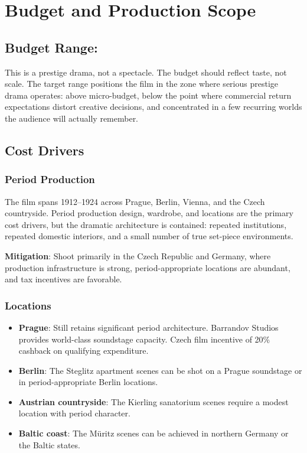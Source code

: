 
\section{Budget and Production Scope}

\subsection{Budget Range: \filmbudgetrange}

This is a prestige drama, not a spectacle. The budget should reflect taste, not scale. The target range positions the film in the zone where serious prestige drama operates: above micro-budget, below the point where commercial return expectations distort creative decisions, and concentrated in a few recurring worlds the audience will actually remember.

\subsection{Cost Drivers}

\subsubsection{Period Production}
The film spans 1912--1924 across Prague, Berlin, Vienna, and the Czech countryside. Period production design, wardrobe, and locations are the primary cost drivers, but the dramatic architecture is contained: repeated institutions, repeated domestic interiors, and a small number of true set-piece environments.

\textbf{Mitigation}: Shoot primarily in the Czech Republic and Germany, where production infrastructure is strong, period-appropriate locations are abundant, and tax incentives are favorable.

\subsubsection{Locations}
\begin{itemize}[leftmargin=*]
\item \textbf{Prague}: Still retains significant period architecture. Barrandov Studios provides world-class soundstage capacity. Czech film incentive of 20\% cashback on qualifying expenditure.
\item \textbf{Berlin}: The Steglitz apartment scenes can be shot on a Prague soundstage or in period-appropriate Berlin locations.
\item \textbf{Austrian countryside}: The Kierling sanatorium scenes require a modest location with period character.
\item \textbf{Baltic coast}: The Müritz scenes can be achieved in northern Germany or the Baltic states.
\end{itemize}


